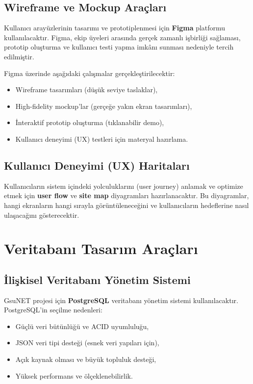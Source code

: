 \documentclass[a4paper,12pt]{report}
\begin{document}
\subsection{Wireframe ve Mockup Araçları}

Kullanıcı arayüzlerinin tasarımı ve prototiplenmesi için \textbf{Figma} platformu kullanılacaktır. Figma, ekip üyeleri arasında gerçek zamanlı işbirliği sağlaması, prototip oluşturma ve kullanıcı testi yapma imkânı sunması nedeniyle tercih edilmiştir.

Figma üzerinde aşağıdaki çalışmalar gerçekleştirilecektir:

\begin{itemize}
    \item Wireframe tasarımları (düşük seviye taslaklar),
    \item High-fidelity mockup'lar (gerçeğe yakın ekran tasarımları),
    \item İnteraktif prototip oluşturma (tıklanabilir demo),
    \item Kullanıcı deneyimi (UX) testleri için materyal hazırlama.
\end{itemize}

\subsection{Kullanıcı Deneyimi (UX) Haritaları}

Kullanıcıların sistem içindeki yolculuklarını (user journey) anlamak ve optimize etmek için \textbf{user flow} ve \textbf{site map} diyagramları hazırlanacaktır. Bu diyagramlar, hangi ekranların hangi sırayla görüntüleneceğini ve kullanıcıların hedeflerine nasıl ulaşacağını gösterecektir.

\section{Veritabanı Tasarım Araçları}

\subsection{İlişkisel Veritabanı Yönetim Sistemi}

GsuNET projesi için \textbf{PostgreSQL} veritabanı yönetim sistemi kullanılacaktır. PostgreSQL'in seçilme nedenleri:

\begin{itemize}
    \item Güçlü veri bütünlüğü ve ACID uyumluluğu,
    \item JSON veri tipi desteği (esnek veri yapıları için),
    \item Açık kaynak olması ve büyük topluluk desteği,
    \item Yüksek performans ve ölçeklenebilirlik.
\end{itemize}
\end{document}
